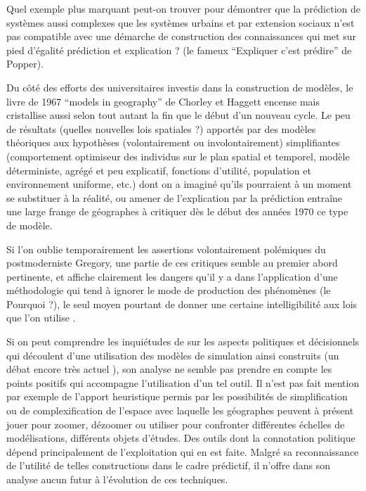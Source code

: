Quel exemple plus marquant peut-on trouver pour démontrer que la prédiction de systèmes aussi complexes que les systèmes urbains et par extension sociaux n'est pas compatible avec une démarche de construction des connaissances qui met sur pied d'égalité prédiction et explication ? (le fameux \enquote{Expliquer c'est prédire} de Popper).

Du côté des efforts des universitaires investis dans la construction de modèles, le livre de 1967 \foreignquote{english}{models in geography} de Chorley et Haggett encense mais cristallise aussi selon \textcite{Golledge2006} tout autant la fin que le début d'un nouveau cycle. Le peu de résultats (quelles nouvelles lois spatiales ?) apportés par des modèles théoriques aux hypothèses (volontairement ou involontairement) simplifiantes (comportement optimiseur des individus sur le plan spatial et temporel, modèle déterministe, agrégé et peu explicatif, fonctions d'utilité, population et environnement uniforme, etc.) dont on a imaginé qu'ils pourraient à un moment se substituer à la réalité, ou amener de l'explication par la prédiction \autocite[41]{Gregory1978} entraîne une large frange de géographes à critiquer dès le début des années 1970 ce type de modèle.

Si l'on oublie temporairement les assertions volontairement polémiques du postmoderniste Gregory, une partie de ces critiques semble au premier abord pertinente, et affiche clairement les dangers qu'il y a dans l'application d'une méthodologie qui tend à ignorer le mode de production des phénomènes (le Pourquoi ?), le seul moyen pourtant de donner une certaine intelligibilité aux lois que l'on utilise \autocite[14-15]{Besse2000}.


Si on peut comprendre les inquiétudes de \textcite{Gregory1978} sur les aspects politiques et décisionnels qui découlent d'une utilisation des modèles de simulation ainsi construits (un débat encore très actuel \autocite{OSullivan2004}), son analyse ne semble pas prendre en compte les points positifs qui accompagne l'utilisation d'un tel outil. Il n'est pas fait mention par exemple de l'apport heuristique permis par les possibilités de simplification ou de complexification de l'espace avec laquelle les géographes peuvent à présent jouer pour zoomer, dézoomer ou utiliser pour confronter différentes échelles de modélisations, différents objets d'études. Des outils dont la connotation politique dépend principalement de l'exploitation qui en est faite. Malgré sa reconnaissance de l'utilité de telles constructions dans le cadre prédictif, il n'offre dans son analyse aucun futur à l'évolution de ces techniques.

